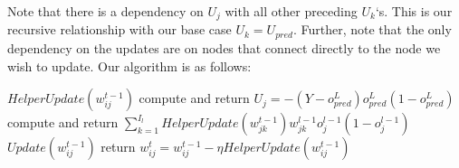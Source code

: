 \documentclass[11pt]{article}
\begin{document}
\vspace{5 mm}
\noindent
Note that there is a dependency on $U_{j}$ with all other preceding $U_{k}$`s. 
This is our recursive relationship with our base case $U_{k} = U_{pred}$. 
Further, note that the only dependency on the updates are on nodes that connect 
directly to the node we wish to update. Our algorithm is as follows:

\vspace{5 mm}
\noindent
\begin{algorithmic}
\STATE $HelperUpdate(w_{i j}^{t - 1})$
    \STATE compute and return $U_{j} = - (Y - o_{pred}^{L}) o_{pred}^{L} 
    (1 - o_{pred}^{L})$ 
\ELSE
    \STATE compute and return $\sum_{k = 1}^{I_{l}} 
    HelperUpdate(w_{j k}^{t - 1}) 
    w_{j k}^{l - 1} o_{j}^{l - 1} (1 - o_{j}^{l - 1})$
\ENDIF
\STATE $Update(w_{i j}^{t - 1})$
\STATE return $w_{i j}^{t} = w_{i j}^{t - 1} - 
\eta HelperUpdate(w_{i j}^{t - 1})$
\end{algorithmic}
\end{document}
